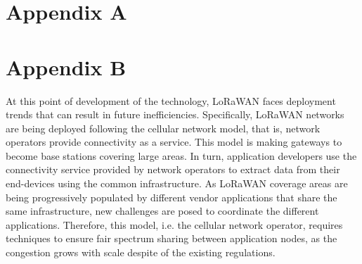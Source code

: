 \documentclass[a4paper, 12pt, twoside,openright]{report}
\begin{document}
\Appendix
	\chapter{Appendix A}
	\minitoc
		
		
		
		
		

	\chapter{Appendix B}
	\minitoc
%		
		

At this point of development of the technology,
	LoRaWAN faces deployment trends that can result in future inefficiencies.
Specifically,
	LoRaWAN networks are being deployed following the cellular network model,
	that is,
	network operators provide connectivity as a service.
This model is making gateways to become base stations covering large areas.
In turn,
	application developers use the connectivity service provided by network operators to extract data from their end-devices using the common infrastructure.
As LoRaWAN coverage areas are being progressively populated by different vendor applications that share the same infrastructure,
	new challenges are posed to coordinate the different applications.
Therefore,
	this model,
	i.e.
the cellular network operator,
	requires techniques to ensure fair spectrum sharing between application nodes,
	as the congestion grows with scale despite of the existing regulations.



\printbibheading

\printbibliography[heading=subbibliography,notkeyword={Behavioral}, title=Others]
\end{document}
